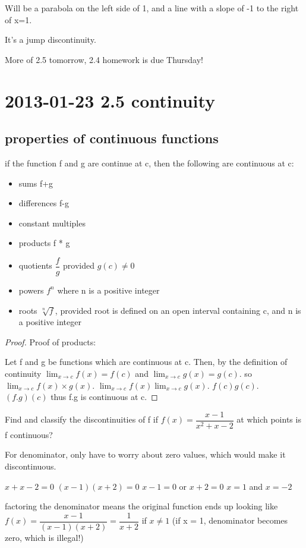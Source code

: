 \documentclass[12pt]{article}
\begin{document}
Will be a parabola on the left side of 1, and a line with a slope of -1 to the right of x=1.

It's a jump discontinuity.


More of 2.5 tomorrow, 2.4 homework is due Thursday!



\section{2013-01-23 2.5 continuity}

\subsection{properties of continuous functions}

if the function f and g are continue at c, then the following are continuous at c:
\begin{itemize}
\item sums f+g
\item differences f-g
\item constant multiples
\item products f * g
\item quotients $\dfrac{f}{g}$ provided $g(c) \neq 0$
\item powers $f^n$ where n is a positive integer
\item roots $\sqrt[n]{f}$, provided root is defined on an open interval containing c, and n is a positive integer
\end{itemize}

\begin{proof}
Proof of products:

Let f and g be functions which are continuous at c.
Then, by the definition of continuity $\lim_{x \to c}f(x)=f(c)$ and $\lim_{x \to c}g(x)=g(c)$.
so $\lim_{x \to c} f(x) \times g(x)$.
 $\lim_{x \to c} f(x) \lim_{x \to c} g(x)$.
 $f(c) g(c)$.
$(f . g) (c)$
thus f.g is continuous at c.

\end{proof}


Find and classify the discontinuities of f if $f(x) = \dfrac{x-1}{x^2+x-2} $ at which points is f continuous?

For denominator, only have to worry about zero values, which would make it discontinuous.

$x+x-2=0$
$(x-1)(x+2)=0$
$x-1=0$ or $x+2=0$
$x=1$ and $x=-2$

factoring the denominator means the original function ends up looking like $f(x) = \dfrac{x-1}{(x-1)(x+2)} = \dfrac{1}{x+2} $
if $x \neq 1$ (if x = 1, denominator becomes zero, which is illegal!)
\end{document}
